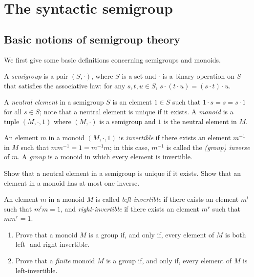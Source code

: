 \section{The syntactic semigroup}\label{sec:semigroups}
\subsection*{Basic notions of semigroup theory}
We first give some basic definitions concerning semigroups and monoids.
\begin{definition}
  A \emph{semigroup} is a pair $(S, \cdot)$, where $S$ is a set and $\cdot$ is a binary operation on $S$ that satisfies the associative law: for any $s, t, u \in S$, $s \cdot (t \cdot u) = (s \cdot t) \cdot u$.

  A \emph{neutral element} in a semigroup $S$ is an element $1 \in S$ such that $1 \cdot s = s = s \cdot 1$ for all $s \in S$; note that a neutral element is unique if it exists. A \emph{monoid} is a tuple $(M, \cdot, 1)$ where $(M, \cdot)$ is a semigroup and $1$ is the neutral element in $M$.

  An element $m$ in a monoid $(M, \cdot, 1)$ is \emph{invertible} if there exists an element $m^{-1}$ in $M$ such that $mm^{-1} = 1 = m^{-1}m$; in this case, $m^{-1}$ is called the \emph{(group) inverse} of $m$. A \emph{group} is a monoid in which every element is invertible.
\end{definition}

\begin{exercise} \easy
  Show that a neutral element in a semigroup is unique if it exists. Show that an element in a monoid has at most one inverse.
\end{exercise}

\begin{exercise} 
An element $m$ in a monoid $M$ is called \emph{left-invertible} if there exists an element $m^l$ such that $m^l m = 1$, and \emph{right-invertible} if there exists an element $m^r$ such that $m m^r = 1$. 
\begin{enumerate}
\item \easy Prove that a monoid $M$ is a group if, and only if, every element of $M$ is both left- and right-invertible.
\item  \medium Prove that a \emph{finite} monoid $M$ is a group if, and only if, every element of $M$ is left-invertible.
\end{enumerate}
\end{exercise}

